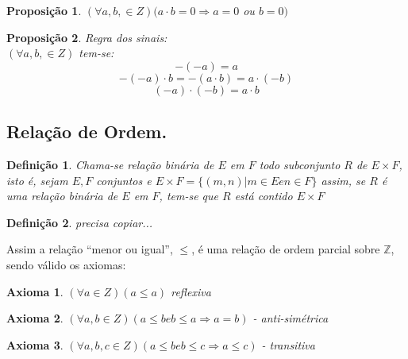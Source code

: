 \documentclass[a4paper,12pt]{article}
\newtheorem{prop}{Proposição}
\newtheorem{definit}{Definição}
\newtheorem{ax}{Axioma}
\begin{document}
\begin{prop} %
  $(\forall a, b, \in Z)(a \cdot b = 0 \Longrightarrow a = 0$ ou $b = 0)$
\end{prop}

\begin{prop} %
  Regra dos sinais:\\
  $(\forall a, b, \in Z)$ tem-se:\\
  \begin{equation} %
    -(-a) = a
  \end{equation}
  \begin{equation} %
    -(-a) \cdot b = -(a \cdot b) = a \cdot (-b)
  \end{equation}
  \begin{equation} %
    (-a) \cdot (-b) = a \cdot b
  \end{equation}
\end{prop}

\subsection{Relação de Ordem.}

\begin{definit}
 Chama-se relação binária de $E$ em $F$  todo subconjunto $R$ de $E \times F$, isto é, sejam $E, F$ conjuntos e $E \times F = \{(m, n) | m \in E e n \in F\}$ assim, se $R$ é uma relação binária de $E$ em $F$, tem-se que $R$ está contido  $ E \times F$ %
\end{definit}

\begin{definit}
 precisa copiar...
\end{definit}

Assim a relação ``menor ou igual'', $\leq$, é uma relação de ordem parcial sobre $\mathbb{Z}$, sendo válido os axiomas:

\begin{ax}
  $(\forall  a \in Z)(a \leq a)$ reflexiva
\end{ax}
\begin{ax}
  $(\forall a, b \in Z)(a \leq b e b \leq a \Longrightarrow a = b)$ - anti-simétrica
\end{ax}
\begin{ax}
  $(\forall a, b, c \in Z)(a \leq b e b \leq c \Longrightarrow a \leq c)$ - transitiva
\end{ax}
\end{document}
